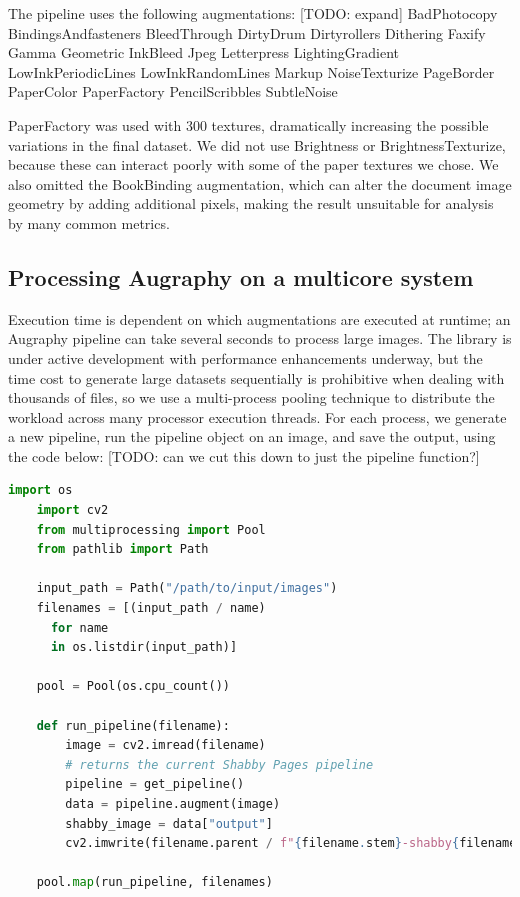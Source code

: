 \documentclass[runningheads]{llncs}
\begin{document}
The pipeline uses the following augmentations: [TODO: expand]
BadPhotocopy
BindingsAndfasteners
BleedThrough
DirtyDrum
Dirtyrollers
Dithering
Faxify
Gamma
Geometric
InkBleed
Jpeg
Letterpress
LightingGradient
LowInkPeriodicLines
LowInkRandomLines
Markup
NoiseTexturize
PageBorder
PaperColor
PaperFactory
PencilScribbles
SubtleNoise

PaperFactory was used with 300 textures, dramatically increasing the possible variations in the final dataset. We did not use Brightness or BrightnessTexturize, because these can interact poorly with some of the paper textures we chose. We also omitted the BookBinding augmentation, which can alter the document image geometry by adding additional pixels, making the result unsuitable for analysis by many common metrics.

\subsection{Processing Augraphy on a multicore system}
Execution time is dependent on which augmentations are executed at runtime; an Augraphy pipeline can take several seconds to process large images.
The library is under active development with performance enhancements underway, but the time cost to generate large datasets sequentially is prohibitive when dealing with thousands of files, so we use a multi-process pooling technique to distribute the workload across many processor execution threads.
For each process, we generate a new pipeline, run the pipeline object on an image, and save the output, using the code below: [TODO: can we cut this down to just the pipeline function?]

\begin{lstlisting}[language=Python]
    import os
    import cv2
    from multiprocessing import Pool
    from pathlib import Path

    input_path = Path("/path/to/input/images")
    filenames = [(input_path / name)
      for name
      in os.listdir(input_path)]

    pool = Pool(os.cpu_count())

    def run_pipeline(filename):
        image = cv2.imread(filename)
        # returns the current Shabby Pages pipeline
        pipeline = get_pipeline()
        data = pipeline.augment(image)
        shabby_image = data["output"]
        cv2.imwrite(filename.parent / f"{filename.stem}-shabby{filename.suffix}")

    pool.map(run_pipeline, filenames)

\end{lstlisting}
\end{document}
